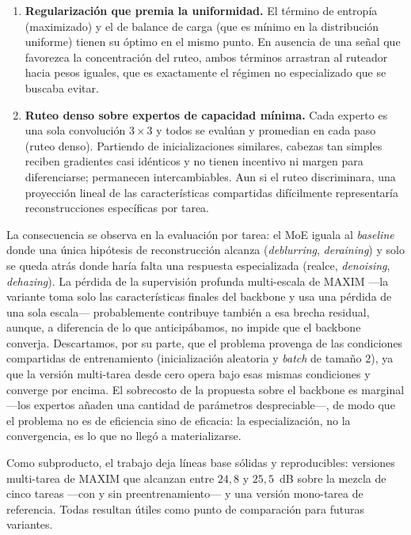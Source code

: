 \documentclass[aps,prl,twocolumn,groupedaddress]{revtex4-2}
\begin{document}
\begin{enumerate}
    \item \textbf{Regularización que premia la uniformidad.} El término de entropía (maximizado) y el de balance de carga (que es mínimo en la distribución uniforme) tienen su óptimo en el mismo punto. En ausencia de una señal que favorezca la concentración del ruteo, ambos términos arrastran al ruteador hacia pesos iguales, que es exactamente el régimen no especializado que se buscaba evitar.
    \item \textbf{Ruteo denso sobre expertos de capacidad mínima.} Cada experto es una sola convolución $3\times 3$ y todos se evalúan y promedian en cada paso (ruteo denso). Partiendo de inicializaciones similares, cabezas tan simples reciben gradientes casi idénticos y no tienen incentivo ni margen para diferenciarse; permanecen intercambiables. Aun si el ruteo discriminara, una proyección lineal de las características compartidas difícilmente representaría reconstrucciones específicas por tarea.
\end{enumerate}

La consecuencia se observa en la evaluación por tarea: el MoE iguala al \textit{baseline} donde una única hipótesis de reconstrucción alcanza (\textit{deblurring}, \textit{deraining}) y solo se queda atrás donde haría falta una respuesta especializada (realce, \textit{denoising}, \textit{dehazing}). La pérdida de la supervisión profunda multi-escala de MAXIM ---la variante toma solo las características finales del backbone y usa una pérdida de una sola escala--- probablemente contribuye también a esa brecha residual, aunque, a diferencia de lo que anticipábamos, no impide que el backbone converja. Descartamos, por su parte, que el problema provenga de las condiciones compartidas de entrenamiento (inicialización aleatoria y \textit{batch} de tamaño $2$), ya que la versión multi-tarea desde cero opera bajo esas mismas condiciones y converge por encima. El sobrecosto de la propuesta sobre el backbone es marginal ---los expertos añaden una cantidad de parámetros despreciable---, de modo que el problema no es de eficiencia sino de eficacia: la especialización, no la convergencia, es lo que no llegó a materializarse.

Como subproducto, el trabajo deja líneas base sólidas y reproducibles: versiones multi-tarea de MAXIM que alcanzan entre $24{,}8$ y $25{,}5$~dB sobre la mezcla de cinco tareas ---con y sin preentrenamiento--- y una versión mono-tarea de referencia. Todas resultan útiles como punto de comparación para futuras variantes.
\end{document}
